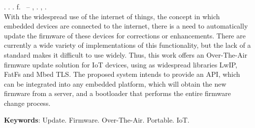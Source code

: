 
\begin{resumo}[ABSTRACT]
\begin{SingleSpacing}

\imprimirautorcitacao. \imprimirtitleabstract. \imprimirdata. \pageref {LastPage} f. \imprimirprojeto\ – \imprimirprograma, \imprimirinstituicao. \imprimirlocal, \imprimirdata.\\

With the widespread use of the internet of things, the concept in which embedded devices are connected to the internet, there is a need to automatically update the firmware of these devices for corrections or enhancements. There are currently a wide variety of implementations of this functionality, but the lack of a standard makes it difficult to use widely.
Thus, this work offers an Over-The-Air firmware update solution for IoT devices, using as widespread libraries LwIP, FatFs and Mbed TLS.
The proposed system intends to provide an API, which can be integrated into any embedded platform, which will obtain the new firmware from a server, and a bootloader that performs the entire firmware change process.

\textbf{Keywords}: Update. Firmware. Over-The-Air. Portable. IoT.

\end{SingleSpacing}
\end{resumo}

